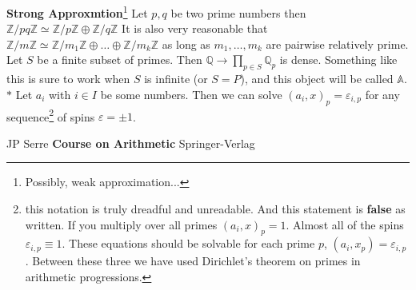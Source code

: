 \documentclass[12pt]{article}
\begin{document}
\newpage

\noindent\textbf{Strong Approxmtion}\footnote{Possibly, weak approximation...}
\newline\newline
Let $p,q$ be two prime numbers then $\mathbb{Z}/pq\mathbb{Z}\simeq 
\mathbb{Z}/p\mathbb{Z}\oplus
\mathbb{Z}/q\mathbb{Z}$
\newline\newline
It is also very reasonable that $\mathbb{Z}/m\mathbb{Z}\simeq 
\mathbb{Z}/m_1\mathbb{Z}\oplus \dots \oplus
\mathbb{Z}/m_k\mathbb{Z}$ as long as $m_1, \dots, m_k$ are pairwise relatively prime.
\newline\newline
Let $S$ be a finite subset of primes.  Then $\displaystyle \mathbb{Q}\to \prod_{p \in S} \mathbb{Q}_p$ is dense.  Something like this is sure to work when $S$ is infinite (or $S=P$), and this object will be called $\mathbb{A}$.
\newline\newline
$\mathbf{\ast}$ Let $a_i$ with $i \in I$ be some numbers.  Then we can solve $(a_i,x)_p = \varepsilon_{i,p}$ for any sequence\footnote{this notation is truly dreadful and unreadable.  And this statement is \textbf{false} as written.  If you multiply over all primes $(a_i,x)_p=1$.  Almost all of the spins $\varepsilon_{i,p}\equiv 1$.  
These equations should be solvable for each prime $p$, $(a_i, x_p) = \varepsilon_{i,p}$.  Between these three we have used Dirichlet's theorem on primes in arithmetic progressions. } of spins $\varepsilon = \pm 1$.

\newpage
{}\selectfont \fontsize{12}{10}\selectfont

\begin{thebibliography}{}

\item JP Serre \textbf{Course on Arithmetic} Springer-Verlag



\end{thebibliography}
\end{document}
